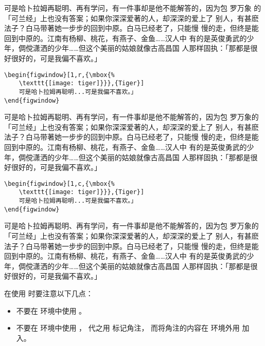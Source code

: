 \begin{window}
	可是哈卜拉姆再聪明、再有学问，有一件事却是他不能解答的，因为包
    罗万象 的「可兰经」上也没有答案；如果你深深爱著的人，却深深的爱上了
	别人，有甚麽法子？白马带著她一步步的回到中原。白马已经老了，只能慢
	慢的走，但终是能回到中原的。江南有杨柳、桃花，有燕子、金鱼……汉人中
	有的是英俊勇武的少年，倜傥潇洒的少年……但这个美丽的姑娘就像古高昌国
	人那样固执：「那都是很好很好的，可是我偏不喜欢。」
\end{window}

\begin{lstlisting}
\begin{figwindow}[1,r,{\mbox{%
	\texttt{[image: tiger]}}},{Tiger}]
	可是哈卜拉姆再聪明...可是我偏不喜欢。」
\end{figwindow}
\end{lstlisting}

\begin{figwindow}
	可是哈卜拉姆再聪明、再有学问，有一件事却是他不能解答的，因为包
	罗万象的「可兰经」上也没有答案；如果你深深爱著的人，却深深的爱上了
	别人，有甚麽法子？白马带著她一步步的回到中原。白马已经老了，只能慢
	慢的走，但终是能回到中原的。江南有杨柳、桃花，有燕子、金鱼……汉人中
	有的是英俊勇武的少年，倜傥潇洒的少年……但这个美丽的姑娘就像古高昌国
	人那样固执：「那都是很好很好的，可是我偏不喜欢。」
\end{figwindow}

\begin{lstlisting}
\begin{figwindow}[1,c,{\mbox{%
	\texttt{[image: tiger]}}},{Tiger}]
	可是哈卜拉姆再聪明...可是我偏不喜欢。」
\end{figwindow}
\end{lstlisting}

\begin{figwindow}
	可是哈卜拉姆再聪明、再有学问，有一件事却是他不能解答的，因为包
	罗万象的「可兰经」上也没有答案；如果你深深爱著的人，却深深的爱上了
	别人，有甚麽法子？白马带著她一步步的回到中原。白马已经老了，只能慢
	慢的走，但终是能回到中原的。江南有杨柳、桃花，有燕子、金鱼……汉人中
	有的是英俊勇武的少年，倜傥潇洒的少年……但这个美丽的姑娘就像古高昌国
	人那样固执：「那都是很好很好的，可是我偏不喜欢。」
\end{figwindow}

在使用  时要注意以下几点：
\begin{itemize}
	\item 不要在  环境中使用 。
	\item 不要在  环境中使用 ，
	代之用  标记角注，
	而将角注的内容在  环境外用  加入。
\end{itemize}

\endinput
